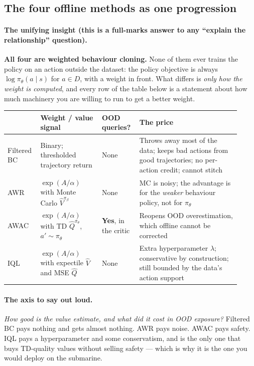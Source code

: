 \documentclass[11pt,a4paper]{article}
\begin{document}
\subsection{The four offline methods as one progression}

\paragraph{The unifying insight (this is a full-marks answer to any
``explain the relationship'' question).} \textbf{All four are weighted
behaviour cloning.} None of them ever trains the policy on an action outside
the dataset: the policy objective is always $\log\pi_\theta(a\mid s)$ for
$a\in D$, with a weight in front. What differs is \emph{only how the weight is
computed}, and every row of the table below is a statement about how much
machinery you are willing to run to get a better weight.

\begin{center}
\small\begin{tabular}{@{}>{\raggedright\arraybackslash}p{0.13\linewidth}>{\raggedright\arraybackslash}p{0.25\linewidth}>{\raggedright\arraybackslash}p{0.13\linewidth}>{\raggedright\arraybackslash}p{0.41\linewidth}@{}}
\toprule
& \textbf{Weight / value signal} & \textbf{OOD queries?} & \textbf{The price} \\
\midrule
Filtered BC & Binary; thresholded trajectory return & None &
Throws away most of the data; keeps bad actions from good trajectories; no
per-action credit; cannot stitch \\
\addlinespace
AWR & $\exp(A/\alpha)$ with Monte Carlo $\hat V^{\pi_\beta}$ & None &
MC is noisy; the advantage is for the \emph{weaker} behaviour policy, not for
$\pi_\theta$ \\
\addlinespace
AWAC & $\exp(A/\alpha)$ with TD $\hat Q^{\pi_\theta}$, $a'\sim\pi_\theta$ &
\textbf{Yes}, in the critic &
Reopens OOD overestimation, which offline cannot be corrected \\
\addlinespace
IQL & $\exp(A/\alpha)$ with expectile $\hat V$ and MSE $\hat Q$ & None &
Extra hyperparameter $\lambda$; conservative by construction; still bounded by
the data's action support \\
\bottomrule
\end{tabular}
\end{center}

\paragraph{The axis to say out loud.} \emph{How good is the value estimate,
and what did it cost in OOD exposure?} Filtered BC pays nothing and gets
almost nothing. AWR pays noise. AWAC pays safety. IQL pays a hyperparameter
and some conservatism, and is the only one that buys TD-quality values without
selling safety --- which is why it is the one you would deploy on the
submarine.
\end{document}
